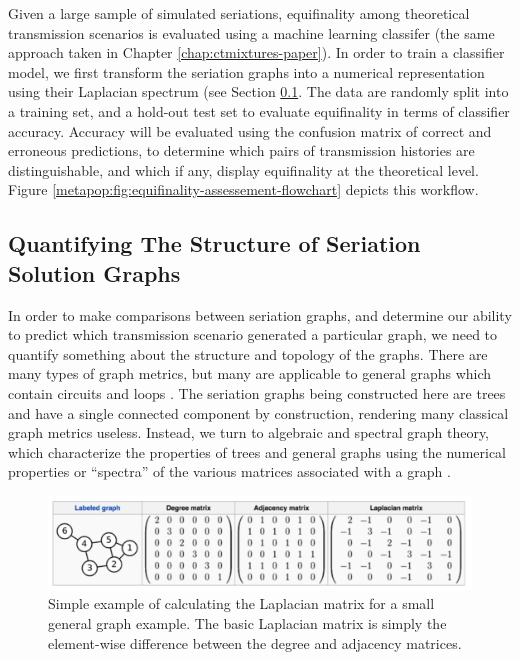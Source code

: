     Given a large sample of simulated seriations, equifinality among theoretical transmission scenarios is evaluated using a machine learning classifer (the same approach taken in Chapter \ref{chap:ctmixtures-paper}).  In order to train a classifier model, we first transform the seriation graphs into a numerical representation using their Laplacian spectrum (see Section \ref{metapop:sec:structure-seriations}.  The data are randomly split into a training set, and a hold-out test set to evaluate equifinality in terms of classifier accuracy.  Accuracy will be evaluated using the confusion matrix of correct and erroneous predictions, to determine which pairs of transmission histories are distinguishable, and which if any, display equifinality at the theoretical level.  Figure \ref{metapop:fig:equifinality-assessement-flowchart} depicts this workflow.
    
    
    \subsection{Quantifying The Structure of Seriation Solution Graphs}\label{metapop:sec:structure-seriations}
    
    In order to make comparisons between seriation graphs, and determine our ability to predict which transmission scenario generated a particular graph, we need to quantify something about the structure and topology of the graphs.  There are many types of graph metrics, but many are applicable to general graphs which contain circuits and loops \citep{chebotarev2013studying,diestel2010graph}.  The seriation graphs being constructed here are trees and have a single connected component by construction, rendering many classical graph metrics useless.  Instead, we turn to algebraic and spectral graph theory, which characterize the properties of trees and general graphs using the numerical properties or ``spectra'' of the various matrices associated with a graph \citep{banerjee2008spectrum,beineke2004topics,chung1997spectral,godsil2001algebraic}.
    
    \begin{figure}[ht]
    \centering
    \includegraphics[scale=0.35]{graphics/multipleseriation/laplacian-matrix-for-graph.pdf}
    \caption{Simple example of calculating the Laplacian matrix for a small general graph example.  The basic Laplacian matrix is simply the element-wise difference between the degree and adjacency matrices.}
    \label{metapop:fig:laplacian-example}
    \end{figure}
    
